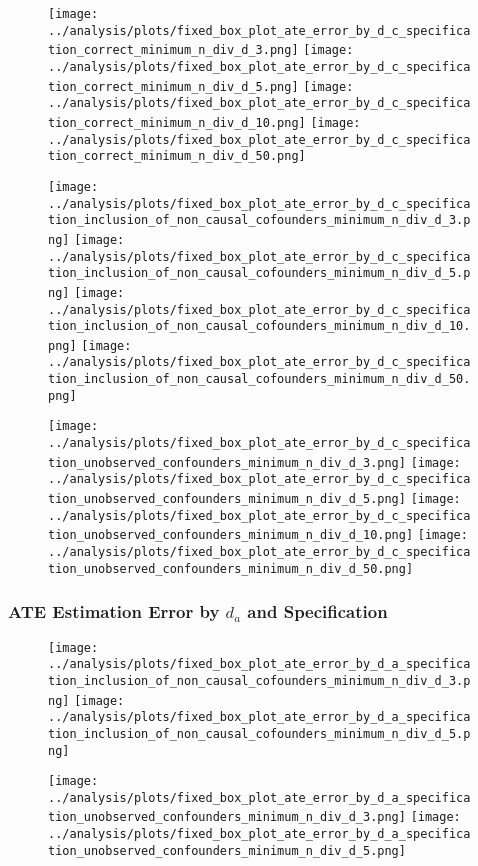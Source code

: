 \documentclass{article}
\numberwithin{equation}{section}
\begin{document}
\begin{figure}[H]
    \centering
    \texttt{[image: ../analysis/plots/fixed\_box\_plot\_ate\_error\_by\_d\_c\_specification\_correct\_minimum\_n\_div\_d\_3.png]}
    \texttt{[image: ../analysis/plots/fixed\_box\_plot\_ate\_error\_by\_d\_c\_specification\_correct\_minimum\_n\_div\_d\_5.png]}
    \texttt{[image: ../analysis/plots/fixed\_box\_plot\_ate\_error\_by\_d\_c\_specification\_correct\_minimum\_n\_div\_d\_10.png]}
    \texttt{[image: ../analysis/plots/fixed\_box\_plot\_ate\_error\_by\_d\_c\_specification\_correct\_minimum\_n\_div\_d\_50.png]}
\end{figure}
\begin{figure}[H]
    \centering
    \texttt{[image: ../analysis/plots/fixed\_box\_plot\_ate\_error\_by\_d\_c\_specification\_inclusion\_of\_non\_causal\_cofounders\_minimum\_n\_div\_d\_3.png]}
    \texttt{[image: ../analysis/plots/fixed\_box\_plot\_ate\_error\_by\_d\_c\_specification\_inclusion\_of\_non\_causal\_cofounders\_minimum\_n\_div\_d\_5.png]}
    \texttt{[image: ../analysis/plots/fixed\_box\_plot\_ate\_error\_by\_d\_c\_specification\_inclusion\_of\_non\_causal\_cofounders\_minimum\_n\_div\_d\_10.png]}
    \texttt{[image: ../analysis/plots/fixed\_box\_plot\_ate\_error\_by\_d\_c\_specification\_inclusion\_of\_non\_causal\_cofounders\_minimum\_n\_div\_d\_50.png]}
\end{figure}
\begin{figure}[H]
    \centering
    \texttt{[image: ../analysis/plots/fixed\_box\_plot\_ate\_error\_by\_d\_c\_specification\_unobserved\_confounders\_minimum\_n\_div\_d\_3.png]}
    \texttt{[image: ../analysis/plots/fixed\_box\_plot\_ate\_error\_by\_d\_c\_specification\_unobserved\_confounders\_minimum\_n\_div\_d\_5.png]}
    \texttt{[image: ../analysis/plots/fixed\_box\_plot\_ate\_error\_by\_d\_c\_specification\_unobserved\_confounders\_minimum\_n\_div\_d\_10.png]}
    \texttt{[image: ../analysis/plots/fixed\_box\_plot\_ate\_error\_by\_d\_c\_specification\_unobserved\_confounders\_minimum\_n\_div\_d\_50.png]}
\end{figure}

\subsubsection{ATE Estimation Error by $d_a$ and Specification}

\begin{figure}[H]
    \centering
    \texttt{[image: ../analysis/plots/fixed\_box\_plot\_ate\_error\_by\_d\_a\_specification\_inclusion\_of\_non\_causal\_cofounders\_minimum\_n\_div\_d\_3.png]}
    \texttt{[image: ../analysis/plots/fixed\_box\_plot\_ate\_error\_by\_d\_a\_specification\_inclusion\_of\_non\_causal\_cofounders\_minimum\_n\_div\_d\_5.png]}
\end{figure}
\begin{figure}[H]
    \centering
    \texttt{[image: ../analysis/plots/fixed\_box\_plot\_ate\_error\_by\_d\_a\_specification\_unobserved\_confounders\_minimum\_n\_div\_d\_3.png]}
    \texttt{[image: ../analysis/plots/fixed\_box\_plot\_ate\_error\_by\_d\_a\_specification\_unobserved\_confounders\_minimum\_n\_div\_d\_5.png]}
\end{figure}
\end{document}
